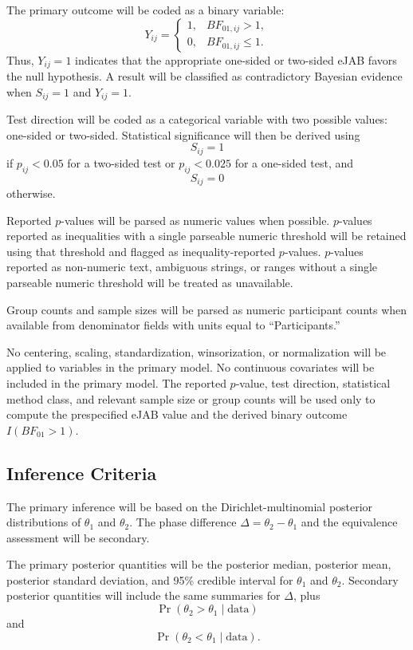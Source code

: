 \documentclass[11pt]{article}
\begin{document}
The primary outcome will be coded as a binary variable:
\[
Y_{ij} =
\begin{cases}
1, & BF_{01,ij} > 1,\\
0, & BF_{01,ij} \leq 1.
\end{cases}
\]
Thus, \(Y_{ij}=1\) indicates that the appropriate one-sided or two-sided eJAB favors the null hypothesis. A result will be classified as contradictory Bayesian evidence when \(S_{ij}=1\) and \(Y_{ij}=1\).

Test direction will be coded as a categorical variable with two possible values: one-sided or two-sided. Statistical significance will then be derived using
\[
S_{ij}=1
\]
if \(p_{ij}<0.05\) for a two-sided test or \(p_{ij}<0.025\) for a one-sided test, and
\[
S_{ij}=0
\]
otherwise.

Reported \(p\)-values will be parsed as numeric values when possible. \(p\)-values reported as inequalities with a single parseable numeric threshold will be retained using that threshold and flagged as inequality-reported \(p\)-values. \(p\)-values reported as non-numeric text, ambiguous strings, or ranges without a single parseable numeric threshold will be treated as unavailable.

Group counts and sample sizes will be parsed as numeric participant counts when available from denominator fields with units equal to ``Participants.''

No centering, scaling, standardization, winsorization, or normalization will be applied to variables in the primary model. No continuous covariates will be included in the primary model. The reported \(p\)-value, test direction, statistical method class, and relevant sample size or group counts will be used only to compute the prespecified eJAB value and the derived binary outcome \(I(BF_{01}>1)\).

\subsection{Inference Criteria}

The primary inference will be based on the Dirichlet-multinomial posterior distributions of \(\theta_1\) and \(\theta_2\). The phase difference \(\Delta=\theta_2-\theta_1\) and the equivalence assessment will be secondary.

The primary posterior quantities will be the posterior median, posterior mean, posterior standard deviation, and 95\% credible interval for \(\theta_1\) and \(\theta_2\). Secondary posterior quantities will include the same summaries for \(\Delta\), plus
\[
\Pr(\theta_2 > \theta_1 \mid \text{data})
\]
and
\[
\Pr(\theta_2 < \theta_1 \mid \text{data}).
\]
\end{document}
